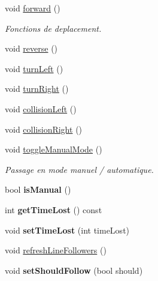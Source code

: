 \begin{DoxyCompactItemize}
\item 
void \hyperlink{group__inf2990_gafa5754bd3c4612519224e23f6afc78ff}{forward} ()
\begin{DoxyCompactList}\small\item\em Fonctions de deplacement. \end{DoxyCompactList}\item 
void \hyperlink{group__inf2990_ga33f628d3ada8ae939a648769e4573783}{reverse} ()
\item 
void \hyperlink{group__inf2990_ga792618ae4dc0d65f9d86c972d3b0d4a5}{turn\-Left} ()
\item 
void \hyperlink{group__inf2990_gafef0435e35696dcccf9b200b6df7913a}{turn\-Right} ()
\item 
void \hyperlink{group__inf2990_ga149d6f3dcca1da160fb96ff54640ae07}{collision\-Left} ()
\item 
void \hyperlink{group__inf2990_ga14b1c17d14b0a924108913c83ac23349}{collision\-Right} ()
\item 
\hypertarget{group__inf2990_ga7b2f749d78882a3ef67814b9e1659135}{void \hyperlink{group__inf2990_ga7b2f749d78882a3ef67814b9e1659135}{toggle\-Manual\-Mode} ()}\label{group__inf2990_ga7b2f749d78882a3ef67814b9e1659135}

\begin{DoxyCompactList}\small\item\em Passage en mode manuel / automatique. \end{DoxyCompactList}\item 
\hypertarget{class_noeud_robot_a41df16754f5948fc314f8cde0426b2d0}{bool {\bfseries is\-Manual} ()}\label{class_noeud_robot_a41df16754f5948fc314f8cde0426b2d0}

\item 
\hypertarget{class_noeud_robot_af3dacf553b94610b1e652abaa50c7231}{int {\bfseries get\-Time\-Lost} () const }\label{class_noeud_robot_af3dacf553b94610b1e652abaa50c7231}

\item 
\hypertarget{class_noeud_robot_a9b8a6d84382e7e5967b9491829a78d10}{void {\bfseries set\-Time\-Lost} (int time\-Lost)}\label{class_noeud_robot_a9b8a6d84382e7e5967b9491829a78d10}

\item 
void \hyperlink{group__inf2990_ga618e0871bd8fe677fe0c2b1cf1a1a8b7}{refresh\-Line\-Followers} ()
\item 
\hypertarget{class_noeud_robot_af82a65d9eb352e22d6ac1ffefb550d3f}{void {\bfseries set\-Should\-Follow} (bool should)}\label{class_noeud_robot_af82a65d9eb352e22d6ac1ffefb550d3f}


\end{DoxyCompactItemize}
